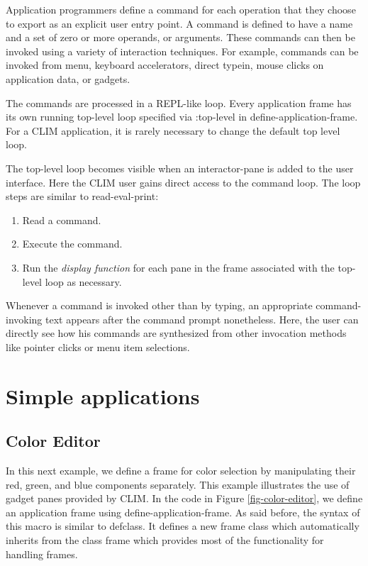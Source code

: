 \documentclass[twocolumn,a4paper]{article}
\newcommand {\concept} [1] {{\sl #1}\index{#1}}
\newcommand {\code}[1]{{\sffamily #1}}
\newcommand {\CLIM}{{\small CLIM}}
\let\class\code
\let\method\code
\let\keyword\code
\begin{document}
Application programmers define a command for each operation that they
choose to export as an explicit user entry point. A command is defined
to have a name and a set of zero or more operands, or arguments. These
commands can then be invoked using a variety of interaction
techniques. For example, commands can be invoked from menu, keyboard
accelerators, direct typein, mouse clicks on application data, or
gadgets.

The commands are processed in a REPL-like loop. Every application
frame has its own running top-level loop specified via
\keyword{:top-level} in \method{define-application-frame}. For a
\CLIM{} application, it is rarely necessary to change the default top
level loop.

The top-level loop becomes visible when an interactor-pane is added to
the user interface. Here the \CLIM{} user gains direct access to the
command loop. The loop steps are similar to read-eval-print:

\begin{enumerate}
\item Read a command.
\item Execute the command.
\item Run the \concept{display function} for each pane in the frame
associated with the top-level loop as necessary.
\end{enumerate}

Whenever a command is invoked other than by typing, an appropriate
command-invoking text appears after the command prompt
nonetheless. Here, the user can directly see how his commands are
synthesized from other invocation methods like pointer clicks or menu
item selections.

\section{Simple applications}

\subsection{Color Editor} In this next example, we define a frame for
color selection by manipulating their red, green, and blue components
separately. This example illustrates the use of gadget panes provided
by \CLIM{}. In the code in Figure \ref{fig-color-editor}, we define an
application frame using \method{define-application-frame}. As said
before, the syntax of this macro is similar to \class{defclass}. It
defines a new frame class which automatically inherits from the class
\class{frame} which provides most of the functionality for handling
frames.
\end{document}
